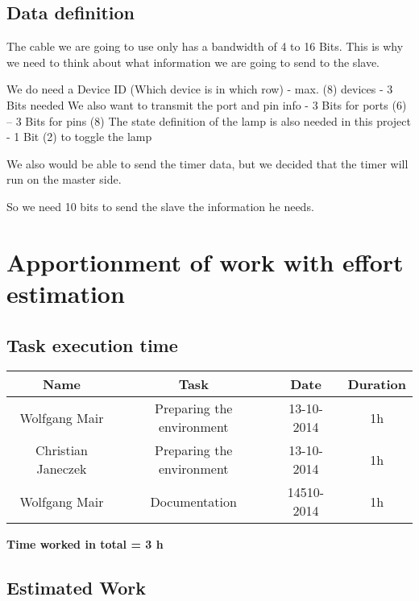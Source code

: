 \documentclass[11pt,a4paper]{article}
\begin{document}
\subsection{Data definition}
The cable we are going to use only has a bandwidth of 4 to 16 Bits. This is why we need to think about what information we are going to send to the slave.

We do need a Device ID (Which device is in which row) - max. (8) devices - 3 Bits needed
We also want to transmit the port and pin info - 3 Bits for ports (6) – 3 Bits for pins (8)
The state definition of the lamp is also needed in this project - 1 Bit (2) to toggle the lamp

We also would be able to send the timer data, but we decided that the timer will run on the master side.

So we need 10 bits to send the slave the information he needs.

\newpage

\section{Apportionment of work with effort estimation}

\subsection{Task execution time}
\begin{table}[h]
\begin{tabular}{@{}|c|c|c|c|@{}}
\toprule
\textbf{Name}         &\textbf{Task}         	 & \textbf{Date} & \textbf{Duration} \\ \midrule
Wolfgang Mair         &Preparing the environment & 13-10-2014    & 1h                \\ \midrule
Christian Janeczek    &Preparing the environment & 13-10-2014    & 1h                \\ \midrule
Wolfgang Mair         &Documentation             & 14510-2014    & 1h             \\ \bottomrule
\end{tabular}
\end{table}

\bf Time worked in total = 3 h

\subsection{Estimated Work}
\end{document}
